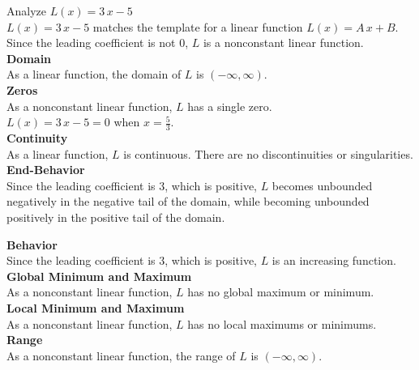 \documentclass{ximera}
\begin{document}
\begin{example}

Analyze $L(x) = 3 \, x - 5$  \\


$L(x) = 3 \, x - 5$ matches the template for a linear function $L(x) = A \, x + B$.\\
Since the leading coefficient is not $0$, $L$ is a nonconstant linear function.\\



\textbf{Domain} \\

As a linear function, the domain of $L$ is $(-\infty, \infty)$.\\


\textbf{Zeros} \\

As a nonconstant linear function, $L$ has a single zero.\\

$L(x) = 3 \, x - 5 = 0$ when $x = \frac{5}{3}$. \\


\textbf{Continuity} \\

As a linear function, $L$ is continuous.  There are no discontinuities or singularities. \\



\textbf{End-Behavior} \\

Since the leading coefficient is $3$, which is positive, $L$ becomes unbounded negatively in the negative tail of the domain, while becoming unbounded positively in the positive tail of the domain.




\textbf{Behavior} \\

Since the leading coefficient is $3$, which is positive, $L$ is an increasing function. \\



\textbf{Global Minimum and Maximum} \\

As a nonconstant linear function, $L$ has no global maximum or minimum. \\



\textbf{Local Minimum and Maximum} \\

As a nonconstant linear function, $L$ has no local maximums or minimums. \\



\textbf{Range} \\

As a nonconstant linear function, the range of $L$ is $(-\infty, \infty)$. \\



\end{example}
\end{document}
